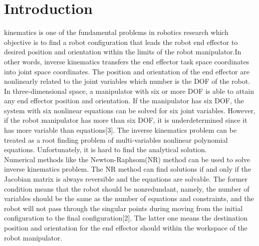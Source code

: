 \documentclass[journal,comsoc]{IEEEtran}
\begin{document}
\section{Introduction}
% 
% 
% 
% 
 kinematics is one of the fundamental problems in robotics research which objective is to find a robot configuration that leads the robot end effector to desired position and orientation within the limits of the robot manipulator.In other words, inverse kinematics transfers the end effector task space coordinates into joint space coordinates. The position and orientation of the end effector are nonlinearly related to the joint variables which number is the DOF of the robot. \\

In three-dimensional space, a manipulator with six or more DOF is able to attain any end effector position and  orientation. If the manipulator has six DOF, the system with six nonlinear equations can be solved for six joint variables. However, if the robot manipulator has more than six DOF, it is underdetermined since it has more variable than equations[3]. The inverse kinematics problem can be treated as a root finding problem of multi-variables nonlinear polynomial equations. Unfortunately, it is hard to find the analytical solution. \\

Numerical methods like the Newton-Raphsom(NR) method can be used to solve inverse kinematics problem. The NR method can find solutions if and only if the Jacobian matrix is always reversible and the equations are solvable. The former condition means that the robot should be nonredundant, namely, the number of variables should be the same as the number of equations and constraints, and the robot will not pass through the singular points during moving from the initial configuration to the final configuration[2]. The latter one means the destination position and orientation for the end effector should within the workspace of the robot manipulator. \\ 
\end{document}
